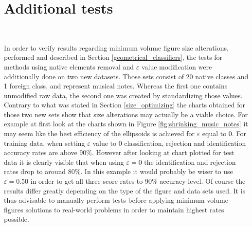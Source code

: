 \section{Additional tests} \ \label{additional_tests}

In order to verify results regarding minimum volume figure size alterations, performed and described in Section \ref{geometrical_classifiers}, the tests for methods using native elements removal and $\varepsilon$ value modification were additionally done on two new datasets. Those sets consist of 20 native classes and 1 foreign class, and represent musical notes. Whereas the first one contains unmodified raw data, the second one was created by standardizing those values. Contrary to what was stated in Section \ref{size_optimizing} the charts obtained for those two new sets show that size alterations may actually be a viable choice. For example at first look at the charts shown in Figure \ref{fig:shrinking_music_notes} it may seem like the best efficiency of the ellipsoids is achieved for $\varepsilon$ equal to 0. For training data, when setting $\varepsilon$ value to 0 classification, rejection and identification accuracy rates are above 90\%. However after looking at chart plotted for test data it is clearly visible that when using $\varepsilon = 0$ the identification and rejection rates drop to around 80\%. In this example it would probably be wiser to use $\varepsilon = 0.50$ in order to get all three score rates to 90\% accuracy level. Of course the results differ greatly depending on the type of the figure and data sets used. It is thus advisable to manually perform tests before applying minimum volume figures solutions to real-world problems in order to maintain highest rates possible.

